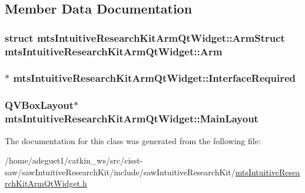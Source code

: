 \subsection{Member Data Documentation}
\hypertarget{classmts_intuitive_research_kit_arm_qt_widget_a8827ac29528271bc9af49e3d767d0a31}{
\subsubsection[{Arm}]{\setlength{\rightskip}{0pt plus 5cm}struct {\bf mts\-Intuitive\-Research\-Kit\-Arm\-Qt\-Widget\-::\-Arm\-Struct}  mts\-Intuitive\-Research\-Kit\-Arm\-Qt\-Widget\-::\-Arm\hspace{0.3cm}{\ttfamily [protected]}}}\label{classmts_intuitive_research_kit_arm_qt_widget_a8827ac29528271bc9af49e3d767d0a31}
\hypertarget{classmts_intuitive_research_kit_arm_qt_widget_a3228df35a189577709a4a62eaeaac798}{
\subsubsection[{Interface\-Required}]{$\ast$ mts\-Intuitive\-Research\-Kit\-Arm\-Qt\-Widget\-::\-Interface\-Required\hspace{0.3cm}{\ttfamily [protected]}}}\label{classmts_intuitive_research_kit_arm_qt_widget_a3228df35a189577709a4a62eaeaac798}
\hypertarget{classmts_intuitive_research_kit_arm_qt_widget_aa0e9d8e3a78462e808be3500a481f683}{
\subsubsection[{Main\-Layout}]{\setlength{\rightskip}{0pt plus 5cm}Q\-V\-Box\-Layout$\ast$ mts\-Intuitive\-Research\-Kit\-Arm\-Qt\-Widget\-::\-Main\-Layout\hspace{0.3cm}{\ttfamily [protected]}}}\label{classmts_intuitive_research_kit_arm_qt_widget_aa0e9d8e3a78462e808be3500a481f683}


The documentation for this class was generated from the following file\-:\begin{DoxyCompactItemize}
\item 
/home/adeguet1/catkin\-\_\-ws/src/cisst-\/saw/saw\-Intuitive\-Research\-Kit/include/saw\-Intuitive\-Research\-Kit/\hyperlink{mts_intuitive_research_kit_arm_qt_widget_8h}{mts\-Intuitive\-Research\-Kit\-Arm\-Qt\-Widget.\-h}\end{DoxyCompactItemize}
